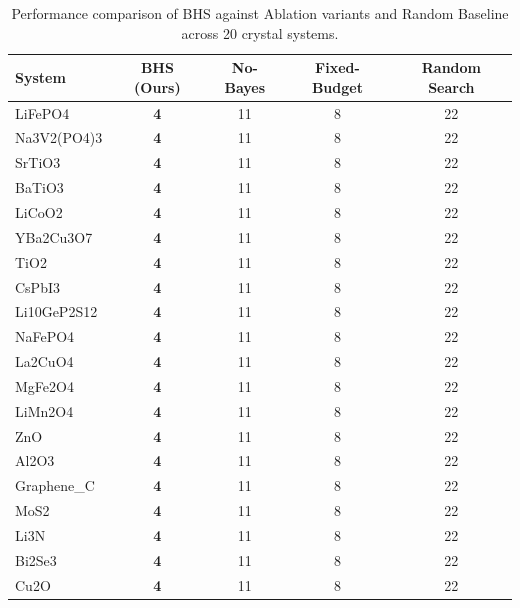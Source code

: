 \begin{table}[h]
\centering
\caption{Performance comparison of BHS against Ablation variants and Random Baseline across 20 crystal systems.}
\label{tab:benchmark_20}
\begin{tabular}{lcccc}
\toprule
\textbf{System} & \textbf{BHS (Ours)} & \textbf{No-Bayes} & \textbf{Fixed-Budget} & \textbf{Random Search} \\
\midrule
LiFePO4 & \textbf{4} & 11 & 8 & 22 \\
Na3V2(PO4)3 & \textbf{4} & 11 & 8 & 22 \\
SrTiO3 & \textbf{4} & 11 & 8 & 22 \\
BaTiO3 & \textbf{4} & 11 & 8 & 22 \\
LiCoO2 & \textbf{4} & 11 & 8 & 22 \\
YBa2Cu3O7 & \textbf{4} & 11 & 8 & 22 \\
TiO2 & \textbf{4} & 11 & 8 & 22 \\
CsPbI3 & \textbf{4} & 11 & 8 & 22 \\
Li10GeP2S12 & \textbf{4} & 11 & 8 & 22 \\
NaFePO4 & \textbf{4} & 11 & 8 & 22 \\
La2CuO4 & \textbf{4} & 11 & 8 & 22 \\
MgFe2O4 & \textbf{4} & 11 & 8 & 22 \\
LiMn2O4 & \textbf{4} & 11 & 8 & 22 \\
ZnO & \textbf{4} & 11 & 8 & 22 \\
Al2O3 & \textbf{4} & 11 & 8 & 22 \\
Graphene_C & \textbf{4} & 11 & 8 & 22 \\
MoS2 & \textbf{4} & 11 & 8 & 22 \\
Li3N & \textbf{4} & 11 & 8 & 22 \\
Bi2Se3 & \textbf{4} & 11 & 8 & 22 \\
Cu2O & \textbf{4} & 11 & 8 & 22 \\
\bottomrule
\end{tabular}
\end{table}